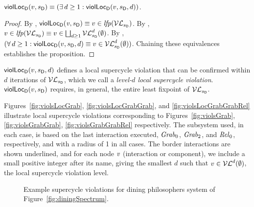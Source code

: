 \begin{proposition}
\label{prop:locViol-equiv-locViolDist}
$\mathsf{violLoc}_{\mathsf{D}}(v,s_\mathsf{D}) \equiv (\exists\, d \ge 1: \mathsf{violLoc}_{\mathsf{D}}(v,s_\mathsf{D},d))$.
\end{proposition}
%
\begin{proof}
By , $\mathsf{violLoc}_{\mathsf{D}}(\mathit{v},s_\mathsf{D}) \equiv v \in \mathit{lfp}(\mathcal{VL}_{s_\mathsf{D}})$.
By , $v \in \mathit{lfp}(\mathcal{VL}_{s_\mathsf{D}}) \equiv v \in \bigsqcup_{d \ge 1} \mathcal{VL}_{s_\mathsf{D}}^{d}(\emptyset)$.
By , $(\forall\, d \ge 1: \mathsf{violLoc}_{\mathsf{D}}(v,s_\mathsf{D},d) \equiv v \in \mathcal{VL}_{s_\mathsf{D}}^{d}(\emptyset))$.
Chaining these equivalences establishes the proposition.
\end{proof}
%
$\mathsf{violLoc}_{\mathsf{D}}(v,s_\mathsf{D},d)$ defines a local supercycle violation that can be confirmed within $d$ iterations of $\mathcal{VL}_{s_\mathsf{D}}$, which we call a
\emph{level-$d$ local supercycle violation}.
$\mathsf{violLoc}_{\mathsf{D}}(v,s_\mathsf{D})$ requires, in general, the entire least fixpoint of $\mathcal{VL}_{s_\mathsf{D}}$.



\begin{example}
\label{exm:loc-dphils-viols}
Figures~\ref{fig:violsLocGrab}, \ref{fig:violsLocGrabGrab}, and \ref{fig:violsLocGrabGrabRel} illustrate local supercycle violations corresponding to
Figures~\ref{fig:violsGrab}, \ref{fig:violsGrabGrab}, \ref{fig:violsGrabGrabRel} respectively. The subsystem used, in each case, is based on the last interaction
executed, \ie $\mathit{Grab}_0$, $\mathit{Grab}_2$, and $\mathit{Rel}_0$, respectively, and with a radius of 1 in all cases.
The border interactions are shown underlined, and 
for each node $\mathit{v}$ (interaction or component), we include a small positive integer after its name, giving the smallest $d$ such that $v \in \mathcal{VL}^{d}(\emptyset)$, 
\ie the local supercycle violation level.
\end{example}



\begin{figure*}[ht]
  \begin{center}
      \quad \quad
       \quad \quad
      \caption{Example supercycle violations for dining philosophers system of Figure~\ref{fig:diningSpectrum}.}
       \label{fig:localDphilsViolations}
  \end{center}
\end{figure*}










